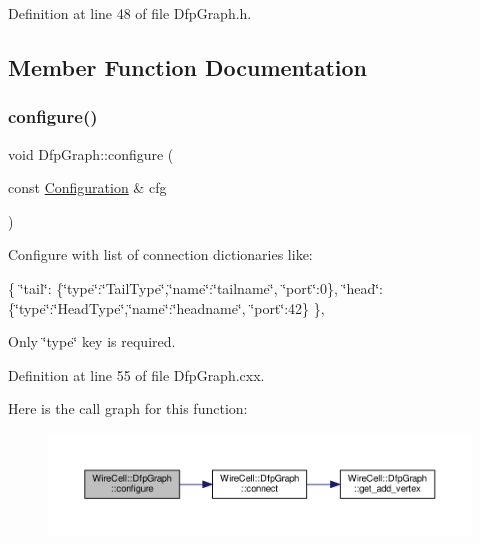 Definition at line 48 of file Dfp\+Graph.\+h.



\subsection{Member Function Documentation}
\mbox{\label{struct_wire_cell_1_1_dfp_graph_aa618fc26a6380c93e382a23c64612e77}} 
\subsubsection{\texorpdfstring{configure()}{configure()}}
{\footnotesize\ttfamily void Dfp\+Graph\+::configure (\begin{DoxyParamCaption}\item[{const \hyperlink{namespace_wire_cell_a9f705541fc1d46c608b3d32c182333ee}{Configuration} \&}]{cfg }\end{DoxyParamCaption})}

Configure with list of connection dictionaries like\+:

\{ \char`\"{}tail\char`\"{}\+: \{\char`\"{}type\char`\"{}\+:\char`\"{}\+Tail\+Type\char`\"{},\char`\"{}name\char`\"{}\+:\char`\"{}tailname\char`\"{}, \char`\"{}port\char`\"{}\+:0\}, \char`\"{}head\char`\"{}\+: \{\char`\"{}type\char`\"{}\+:\char`\"{}\+Head\+Type\char`\"{},\char`\"{}name\char`\"{}\+:\char`\"{}headname\char`\"{}, \char`\"{}port\char`\"{}\+:42\} \},

Only \char`\"{}type\char`\"{} key is required. 

Definition at line 55 of file Dfp\+Graph.\+cxx.

Here is the call graph for this function\+:
\nopagebreak
\begin{figure}[H]
\begin{center}
\leavevmode
\includegraphics[width=350pt]{struct_wire_cell_1_1_dfp_graph_aa618fc26a6380c93e382a23c64612e77_cgraph}
\end{center}
\end{figure}
\mbox{\label{struct_wire_cell_1_1_dfp_graph_af4a13a365021fdaf75e8aa699bc7262f}} 
